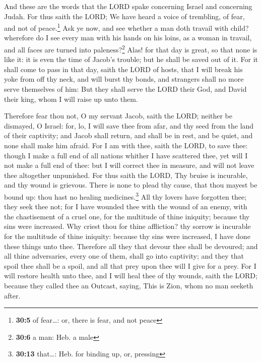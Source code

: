  And these are the words that the LORD spake concerning
Israel and concerning Judah.  For thus saith the LORD; We
have heard a voice of trembling, of fear, and not of peace.\footnote{\textbf{30:5}
  of fear\ldots: or, there is fear, and not peace}  Ask ye
now, and see whether a man doth travail with child? wherefore do I see
every man with his hands on his loins, as a woman in travail, and all
faces are turned into paleness?\footnote{\textbf{30:6} a man: Heb. a
  male}  Alas! for that day is great, so that none is like
it: it is even the time of Jacob's trouble; but he shall be saved out of
it.  For it shall come to pass in that day, saith the LORD
of hosts, that I will break his yoke from off thy neck, and will burst
thy bonds, and strangers shall no more serve themselves of him:
 But they shall serve the LORD their God, and David their
king, whom I will raise up unto them.

 Therefore fear thou not, O my servant Jacob, saith the
LORD; neither be dismayed, O Israel: for, lo, I will save thee from
afar, and thy seed from the land of their captivity; and Jacob shall
return, and shall be in rest, and be quiet, and none shall make him
afraid.  For I am with thee, saith the LORD, to save
thee: though I make a full end of all nations whither I have scattered
thee, yet will I not make a full end of thee: but I will correct thee in
measure, and will not leave thee altogether unpunished. 
For thus saith the LORD, Thy bruise is incurable, and thy wound is
grievous.  There is none to plead thy cause, that thou
mayest be bound up: thou hast no healing medicines.\footnote{\textbf{30:13}
  that\ldots: Heb. for binding up, or, pressing}  All thy
lovers have forgotten thee; they seek thee not; for I have wounded thee
with the wound of an enemy, with the chastisement of a cruel one, for
the multitude of thine iniquity; because thy sins were increased.
 Why criest thou for thine affliction? thy sorrow is
incurable for the multitude of thine iniquity: because thy sins were
increased, I have done these things unto thee.  Therefore
all they that devour thee shall be devoured; and all thine adversaries,
every one of them, shall go into captivity; and they that spoil thee
shall be a spoil, and all that prey upon thee will I give for a prey.
 For I will restore health unto thee, and I will heal
thee of thy wounds, saith the LORD; because they called thee an Outcast,
saying, This is Zion, whom no man seeketh after.

